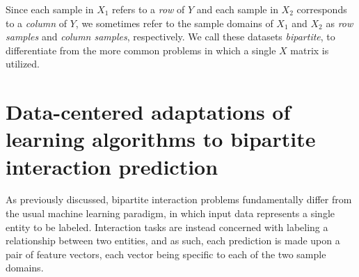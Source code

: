 Since each sample in $X_1$ refers to a \emph{row} of $Y$ and each sample in
$X_2$ corresponds to a \emph{column} of $Y$, we sometimes refer to the sample
domains of $X_1$ and $X_2$ as \emph{row samples} and \emph{column samples},
respectively.
We call these datasets \emph{bipartite}, to differentiate from the more common problems in which a single $X$ matrix is utilized.








\section{Data-centered adaptations of learning algorithms to bipartite interaction prediction}
\label{sec:standard adaptations}

As previously discussed,
bipartite interaction problems fundamentally differ from the usual machine learning paradigm, in which input data represents a single entity to be labeled. Interaction tasks are instead concerned with labeling a relationship between two entities, and as such, each prediction is made upon a pair of feature vectors, each vector being specific to each of the two sample domains.

